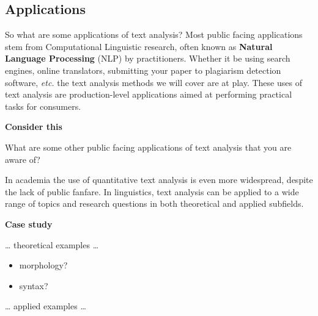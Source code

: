 \documentclass[
  letterpaper,
]{latex/krantz}
\providecommand{\tightlist}{%
  \setlength{\itemsep}{0pt}\setlength{\parskip}{0pt}}\usepackage{longtable,booktabs,array}
\begin{document}
\hypertarget{applications}{%
\subsection{Applications}\label{applications}}

So what are some applications of text analysis? Most public facing
applications stem from Computational Linguistic research, often known as
\textbf{Natural Language Processing} (NLP) by practitioners. Whether it
be using search engines, online translators, submitting your paper to
plagiarism detection software, \emph{etc.} the text analysis methods we
will cover are at play. These uses of text analysis are production-level
applications aimed at performing practical tasks for consumers.

\begin{tcolorbox}[enhanced jigsaw, left=2mm, arc=.35mm, colback=white, rightrule=.15mm, toprule=.15mm, breakable, leftrule=.75mm, opacityback=0, bottomrule=.15mm]

\textbf{ Consider this}

What are some other public facing applications of text analysis that you
are aware of?

\end{tcolorbox}

In academia the use of quantitative text analysis is even more
widespread, despite the lack of public fanfare. In linguistics, text
analysis can be applied to a wide range of topics and research questions
in both theoretical and applied subfields.

\begin{tcolorbox}[enhanced jigsaw, left=2mm, arc=.35mm, colback=white, rightrule=.15mm, toprule=.15mm, breakable, leftrule=.75mm, opacityback=0, bottomrule=.15mm]

\textbf{ Case study}

\ldots{} theoretical examples \ldots{}

\begin{itemize}
\tightlist
\item
  morphology?
\item
  syntax?
\end{itemize}

\end{tcolorbox}

\ldots{} applied examples \ldots{}
\end{document}
